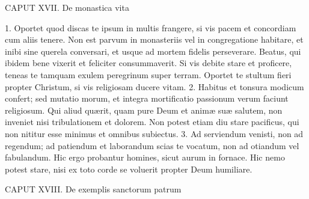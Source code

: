 \documentclass[twoside]{article}
\begin{document}
CAPUT XVII.
De monastica vita

1. Oportet quod discas te ipsum in multis frangere, si vis pacem et concordiam cum aliis tenere. Non est parvum in monasteriis vel in congregatione habitare, et inibi sine querela conversari, et usque ad mortem fidelis perseverare. Beatus, qui ibidem bene vixerit et feliciter consummaverit. Si vis debite stare et proficere, teneas te tamquam exulem peregrinum super terram. Oportet te stultum fieri propter Christum, si vis religiosam ducere vitam.
2. Habitus et tonsura modicum confert; sed mutatio morum, et integra mortificatio passionum verum faciunt religiosum. Qui aliud quærit, quam pure Deum et animæ suæ salutem, non inveniet nisi tribulationem et dolorem. Non potest etiam diu stare pacificus, qui non nititur esse minimus et omnibus subiectus.
3. Ad serviendum venisti, non ad regendum; ad patiendum et laborandum scias te vocatum, non ad otiandum vel fabulandum. Hic ergo probantur homines, sicut aurum in fornace. Hic nemo potest stare, nisi ex toto corde se voluerit propter Deum humiliare.


CAPUT XVIII.
De exemplis sanctorum patrum
\end{document}
